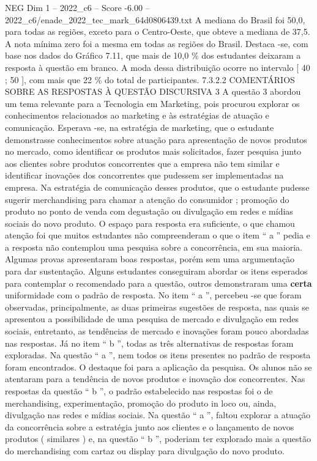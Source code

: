 \begin{textsample}{NEG Dim 1 – 2022\_c6 – Score -6.00 – 2022\_c6/enade\_2022\_tec\_mark\_64d0806439.txt}
A mediana do Brasil foi 50,0, para todas as regiões, exceto para o Centro-Oeste, que obteve a mediana de 37,5.
A nota mínima zero foi a mesma em todas as regiões do Brasil.
Destaca -se, com base nos dados do Gráfico 7.11, que mais de 10,0 \% dos estudantes deixaram a resposta à questão em branco.
A moda dessa distribuição ocorre no intervalo [ 40 ; 50 ], com mais que 22 \% do total de participantes. 7.3.2.2 COMENTÁRIOS SOBRE AS RESPOSTAS À QUESTÃO DISCURSIVA 3 A questão 3 abordou um tema relevante para a Tecnologia em Marketing, pois procurou explorar os conhecimentos relacionados ao marketing e às estratégias de atuação e comunicação.
Esperava -se, na estratégia de marketing, que o estudante demonstrasse conhecimentos sobre atuação para apresentação de novos produtos no mercado, como identificar os produtos mais solicitados, fazer pesquisa junto aos clientes sobre produtos concorrentes que a empresa não tem similar e identificar inovações dos concorrentes que pudessem ser implementadas na empresa.
Na estratégia de comunicação desses produtos, que o estudante pudesse sugerir merchandising para chamar a atenção do consumidor ; promoção do produto no ponto de venda com degustação ou divulgação em redes e mídias sociais do novo produto.
O espaço para resposta era suficiente, o que chamou atenção foi que muitos estudantes não compreenderam o que o item “ a ” pedia e a resposta não contemplou uma pesquisa sobre a concorrência, em sua maioria.
Algumas provas apresentaram boas respostas, porém sem uma argumentação para dar sustentação.
Alguns estudantes conseguiram abordar os itens esperados para contemplar o recomendado para a questão, outros demonstraram uma \textbf{certa} uniformidade com o padrão de resposta.
No item “ a ”, percebeu -se que foram observadas, principalmente, as duas primeiras sugestões de resposta, nas quais se apresentou a possibilidade de uma pesquisa de mercado e divulgação em redes sociais, entretanto, as tendências de mercado e inovações foram pouco abordadas nas respostas.
Já no item “ b ”, todas as três alternativas de respostas foram exploradas.
Na questão “ a ”, nem todos os itens presentes no padrão de resposta foram encontrados.
O destaque foi para a aplicação da pesquisa.
Os alunos não se atentaram para a tendência de novos produtos e inovação dos concorrentes.
Nas respostas da questão “ b ”, o padrão estabelecido nas respostas foi o de merchandising, experimentação, promoção do produto in loco ou, ainda, divulgação nas redes e mídias sociais.
Na questão “ a ”, faltou explorar a atuação da concorrência sobre a estratégia junto aos clientes e o lançamento de novos produtos ( similares ) e, na questão “ b ”, poderiam ter explorado mais a questão do merchandising com cartaz ou display para divulgação do novo produto.

\end{textsample}
